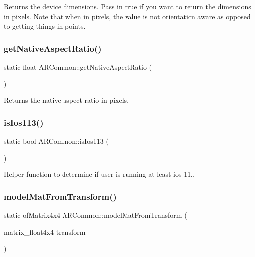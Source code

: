 Returns the device dimensions. Pass in true if you want to return the dimensions in pixels. Note that when in pixels, the value is not orientation aware as opposed to getting things in points. \mbox{\label{namespace_a_r_common_a00f3449531f154cba4a751128117052f}} 
\subsubsection{\texorpdfstring{get\+Native\+Aspect\+Ratio()}{getNativeAspectRatio()}}
{\footnotesize\ttfamily static float A\+R\+Common\+::get\+Native\+Aspect\+Ratio (\begin{DoxyParamCaption}{ }\end{DoxyParamCaption})\hspace{0.3cm}{\ttfamily [static]}}



Returns the native aspect ratio in pixels. 

\mbox{\label{namespace_a_r_common_a7939654fc3c2d04150e4cbf6953429d9}} 
\subsubsection{\texorpdfstring{is\+Ios113()}{isIos113()}}
{\footnotesize\ttfamily static bool A\+R\+Common\+::is\+Ios113 (\begin{DoxyParamCaption}{ }\end{DoxyParamCaption})\hspace{0.3cm}{\ttfamily [static]}}



Helper function to determine if user is running at least ios 11.. 

\mbox{\label{namespace_a_r_common_aec58705c71590506c5f1f86e927f11e1}} 
\subsubsection{\texorpdfstring{model\+Mat\+From\+Transform()}{modelMatFromTransform()}}
{\footnotesize\ttfamily static of\+Matrix4x4 A\+R\+Common\+::model\+Mat\+From\+Transform (\begin{DoxyParamCaption}\item[{matrix\+\_\+float4x4}]{transform }\end{DoxyParamCaption})\hspace{0.3cm}{\ttfamily [static]}}



